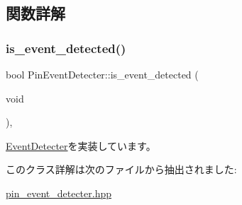 \subsection{関数詳解}
\mbox{\label{class_pin_event_detecter_a6e65a11e39838c30f58c66dd057abc90}} 
\subsubsection{\texorpdfstring{is\_event\_detected()}{is\_event\_detected()}}
{\footnotesize\ttfamily bool Pin\+Event\+Detecter\+::is\+\_\+event\+\_\+detected (\begin{DoxyParamCaption}\item[{void}]{ }\end{DoxyParamCaption})\hspace{0.3cm}{\ttfamily [inline]}, {\ttfamily [virtual]}}



\mbox{\hyperlink{class_event_detecter_ae5f2c62e1226dcd9434eef3db92a8a70}{Event\+Detecter}}を実装しています。



このクラス詳解は次のファイルから抽出されました\+:\begin{DoxyCompactItemize}
\item 
\mbox{\hyperlink{pin__event__detecter_8hpp}{pin\+\_\+event\+\_\+detecter.\+hpp}}\end{DoxyCompactItemize}
